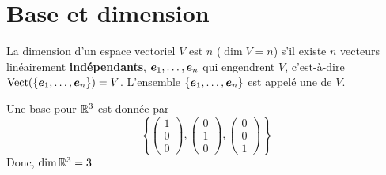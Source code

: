 \section{Base et dimension}

\begin{defini}
La dimension d'un espace vectoriel $V$ est $n$ ($\dim V = n$) s'il existe $n$ vecteurs linéairement \textbf{indépendants},
$\boldsymbol{e}_1, \ldots, \boldsymbol{e}_n$ qui engendrent $V$, c'est-à-dire $\operatorname{Vect}(\{\boldsymbol{e}_1, \ldots, \boldsymbol{e}_n\}) = V$.
L'ensemble $\{\boldsymbol{e}_1, \ldots, \boldsymbol{e}_n\}$ est appelé une  de $V$.
\end{defini}
\begin{exemple}
Une base pour $\mathbb{R}^3$ est donnée par 
\[
\left\{ \begin{pmatrix}
1\\0 \\0
\end{pmatrix},
\begin{pmatrix}
0 \\ 1 \\0
\end{pmatrix},
\begin{pmatrix}
0 \\ 0 \\1
\end{pmatrix}
\right\}
\]
Donc, $\dim \mathbb{R}^3 = 3$ 
\end{exemple}
